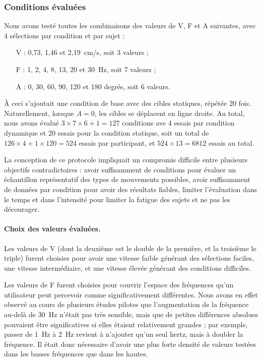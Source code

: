 	\subsubsection{Conditions évaluées}
	Nous avons testé toutes les combinaisons des valeurs de V, F et A suivantes, avec 4 sélections par condition et par sujet :
	
	\begin{itemize}
		\item[V :] 0,73, 1,46 et 2,19~cm/s, soit 3 valeurs ;
		\item[F :] 1, 2, 4, 8, 13, 20 et 30~Hz, soit 7 valeurs ;
		\item[A :] 0, 30, 60, 90, 120 et 180 degrés, soit 6 valeurs.
	\end{itemize}
	
	À ceci s'ajoutait une condition de base avec des cibles statiques, répétée 20 fois. Naturellement, lorsque $A = 0$, les cibles se déplacent en ligne droite. Au total, nous avons évalué $3 \times 7 \times 6 + 1 = 127$ conditions ave 4 essais par condition dynamique et 20 essais pour la condition statique, soit un total de $126 \times 4 + 1 \times 120 = 524$ essais par participant, et $524 \times 13 = 6812$ essais au total.
	
	La conception de ce protocole impliquait un compromis difficile entre plusieurs objectifs contradictoires : avoir suffisamment de conditions pour évaluer un échantillon représentatif des types de mouvements possibles, avoir suffisamment de données par condition pour avoir des résultats fiables, limiter l'évaluation dans le temps et dans l'intensité pour limiter la fatigue des sujets et ne pas les décourager.
	
	\paragraph{Choix des valeurs évaluées.}
	Les valeurs de V (dont la deuxième est le double de la première, et la troisième le triple) furent choisies pour avoir une vitesse faible générant des sélections faciles, une vitesse intermédiaire, et une vitesse élevée générant des conditions difficiles.
	
	Les valeurs de F furent choisies pour couvrir l'espace des fréquences qu'un utilisateur peut percevoir comme significativement différentes. Nous avons en effet observé au cours de plusieurs études pilotes que l'augmentation de la fréquence au-delà de 30~Hz n'était pas très sensible, mais que de petites différences absolues pouvaient être significatives si elles étaient relativement grandes ; par exemple, passer de 1~Hz à 2~Hz revient à n'ajouter qu'un seul hertz, mais à doubler la fréquence. Il était donc nécessaire d'avoir une plus forte densité de valeurs testées dans les basses fréquences que dans les hautes.
	
